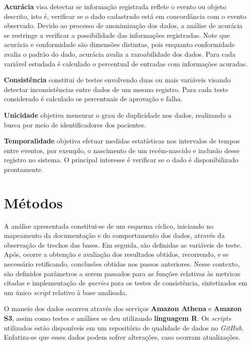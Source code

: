 \documentclass[
  12,
  table]{proadi}
\begin{document}
\textbf{Acurácia} visa detectar se informação registrada reflete o
evento ou objeto descrito, isto é, verificar se o dado cadastrado está
em concordância com o evento observado. Devido ao processo de
anonimização dos dados, a análise de acurácia se restringe a verificar a
possibilidade das informações registradas. Note que acurácia e
conformidade são dimensões distintas, pois enquanto conformidade avalia
o padrão do dado, acurácia avalia a razoabilidade dos dados. Para cada
variável estudada é calculado o percentual de entradas com informações
acuradas.

\textbf{Consistência} constitui de testes envolvendo duas ou mais
variáveis visando detectar inconsistências entre dados de um mesmo
registro. Para cada teste considerado é calculado os percentuais de
aprovação e falha.

\textbf{Unicidade} objetiva mensurar o grau de duplicidade nos dados,
realizando a busca por meio de identificadores dos pacientes.

\textbf{Temporalidade} objetiva efetuar medidas estatísticas nos
intervalos de tempos entre eventos, por exemplo, o nascimento de um
recém-nascido e inclusão desse registro no sistema. O principal
interesse é verificar se o dado é disponibilizado prontamente.

\renewcommand{\arraystretch}{1.25}

\renewcommand{\arraystretch}{1}

\hypertarget{muxe9todos}{%
\section{Métodos}\label{muxe9todos}}

A análise apresentada constitui-se de um esquema cíclico, iniciando no
mapeamento da documentação e do comportamento dos dados, através da
observação de trechos das bases. Em seguida, são definidas as variáveis
de teste. Após, ocorre a obtenção e avaliação dos resultados obtidos,
recorrendo, e se necessário retificando, conclusões obtidas nos passos
anteriores. Nesse contexto, são definidos parâmetros a serem passados
para as funções relativas às metricas citadas e implementação de
\emph{queries} para os testes de consistência, sintetizados em um único
\emph{script} relativo à base analisada.

O maneio dos dados ocorreu através dos serviços \textbf{Amazon Athena} e
\textbf{Amazon S3}, assim como testes e análises se deu utilizando
\textbf{linguagem R}. Os \emph{scripts} utilizados estão disponíveis em
um repositório de qualidade de dados no \emph{GitHub}. Enfatiza-se que
esses dados podem sofrer alterações, caso ocorram atualizações.
\end{document}
